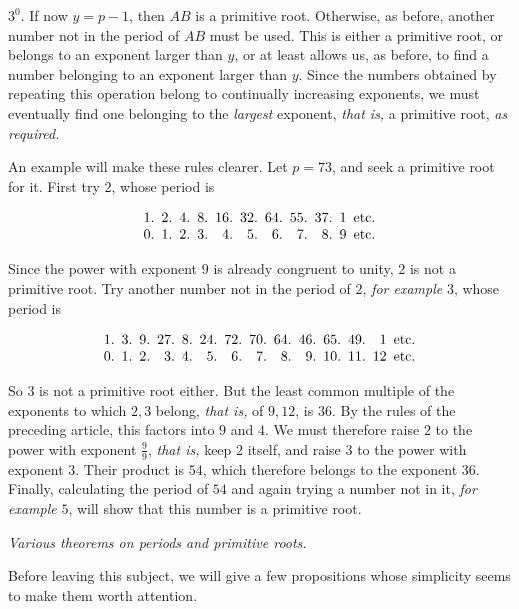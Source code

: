 $3^0$. If now $y=p-1$, then $AB$ is a primitive root. Otherwise, as before, another number not in the period of $AB$ must be used. This is either a primitive root, or belongs to an exponent larger than $y$, or at least allows us, as before, to find a number belonging to an exponent larger than $y$. Since the numbers obtained by repeating this operation belong to continually increasing exponents, we must eventually find one belonging to the \emph{largest} exponent, \emph{that is,} a primitive root, \emph{as required.}

An example will make these rules clearer. Let $p=73$, and seek a primitive root for it. First try $2$, whose period is

\[\setlength{\arraycolsep}{2.5pt}\begin{array}{@{}rrrrrrrrrrl@{}}
1.&2.&4.&8.&16.&32.&64.&55.&37.&1&\text{etc.}\\
0.&1.&2.&3.&4.&5.&6.&7.&8.&9&\text{etc.}
\end{array}\]

Since the power with exponent $9$ is already congruent to unity, $2$ is not a primitive root. Try another number not in the period of $2$, \emph{for example} $3$, whose period is

\[\setlength{\arraycolsep}{2.5pt}\begin{array}{@{}rrrrrrrrrrrrrl@{}}
1.&3.&9.&27.&8.&24.&72.&70.&64.&46.&65.&49.&1&\text{etc.}\\
0.&1.&2.&3.&4.&5.&6.&7.&8.&9.&10.&11.&12&\text{etc.}
\end{array}\]

So $3$ is not a primitive root either. But the least common multiple of the exponents to which $2,3$ belong, \emph{that is,} of $9,12$, is $36$. By the rules of the preceding article, this factors into $9$ and $4$. We must therefore raise $2$ to the power with exponent $\frac{9}{9}$, \emph{that is,} keep $2$ itself, and raise $3$ to the power with exponent $3$. Their product is $54$, which therefore belongs to the exponent $36$. Finally, calculating the period of $54$ and again trying a number not in it, \emph{for example} $5$, will show that this number is a primitive root.

\begin{center}\emph{Various theorems on periods and primitive roots.}\end{center}

Before leaving this subject, we will give a few propositions whose simplicity seems to make them worth attention.

